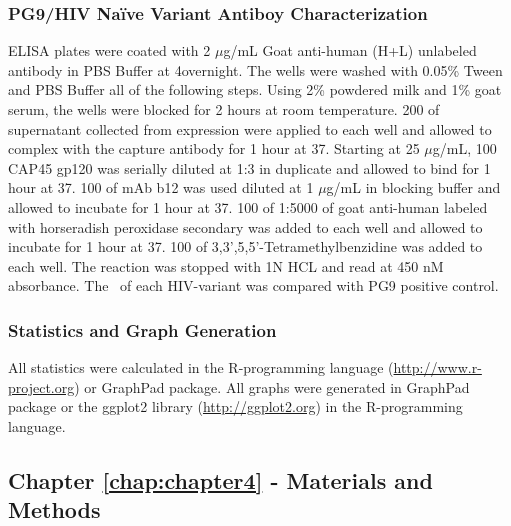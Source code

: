 \subsubsection{PG9/HIV Na\"ive Variant Antiboy Characterization}
ELISA plates were coated with 2 $\mu$g/mL Goat anti-human (H+L) unlabeled antibody in PBS Buffer at 4\degree overnight. The wells were washed with 0.05\% Tween and PBS Buffer all of the following steps. Using 2\% powdered milk and 1\% goat serum, the wells were blocked for 2 hours at room temperature. 200 \microliter of supernatant collected from expression were applied to each well and allowed to complex with the capture antibody for 1 hour at 37\degree. Starting at 25 $\mu$g/mL, 100 \microliter CAP45 gp120 was serially diluted at 1:3 in duplicate and allowed to bind for 1 hour at 37\degree. 100 \microliter of mAb b12 was used diluted at 1 $\mu$g/mL in blocking buffer and allowed to incubate for 1 hour at 37\degree. 100 \microliter of 1:5000 of goat anti-human labeled with horseradish peroxidase secondary was added to each well and allowed to incubate for 1 hour at 37\degree. 100 \microliter of 3,3',5,5'-Tetramethylbenzidine was added to each well. The reaction was stopped with 1N HCL and read at 450 nM absorbance. The \ec~of each HIV-\naive variant was compared with PG9 positive control.


\subsubsection{Statistics and Graph Generation}
All statistics were calculated in the R-programming language (\url{http://www.r-project.org}) or GraphPad package. All graphs were generated in GraphPad package or the ggplot2 library (\url{http://ggplot2.org}) in the R-programming language.

\clearpage

\subsection{Chapter \ref{chap:chapter4} - Materials and Methods}
\par\vspace{10pt}
